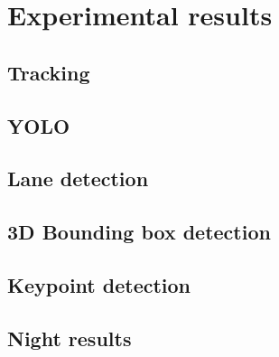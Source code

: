 \chapter{Experimental results}
\label{chap:experimental}
\section{Tracking}
\section{YOLO}
\section{Lane detection}
\section{3D Bounding box detection}
\section{Keypoint detection}
\section{Night results}